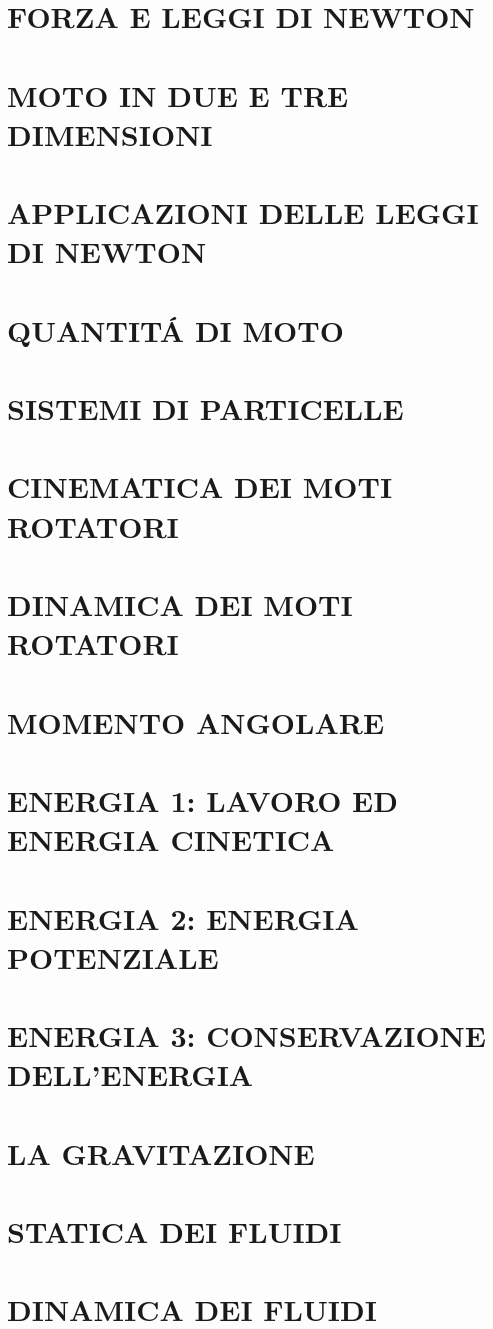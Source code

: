 \documentclass{article}
\begin{document}
	\section{FORZA E LEGGI DI NEWTON}
	\section{MOTO IN DUE E TRE DIMENSIONI}
	\section{APPLICAZIONI DELLE LEGGI DI NEWTON}
	\section{QUANTIT\'A DI MOTO}
	\section{SISTEMI DI PARTICELLE}
	\section{CINEMATICA DEI MOTI ROTATORI}
	\section{DINAMICA DEI MOTI ROTATORI}
	\section{MOMENTO ANGOLARE}
	\section{ENERGIA 1: LAVORO ED ENERGIA CINETICA}
	\section{ENERGIA 2: ENERGIA POTENZIALE}
	\section{ENERGIA 3: CONSERVAZIONE DELL'ENERGIA}
	\section{LA GRAVITAZIONE}
	\section{STATICA DEI FLUIDI}
	\section{DINAMICA DEI FLUIDI}
\end{document}
